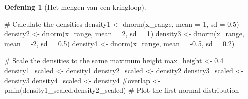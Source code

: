 \documentclass[
  a4paper,
]{scrbook}
\newenvironment{Shaded}{\begin{snugshade}}{\end{snugshade}}
\newcommand{\AttributeTok}[1]{\textcolor[rgb]{0.40,0.45,0.13}{#1}}
\newcommand{\CommentTok}[1]{\textcolor[rgb]{0.37,0.37,0.37}{#1}}
\newcommand{\DecValTok}[1]{\textcolor[rgb]{0.68,0.00,0.00}{#1}}
\newcommand{\FloatTok}[1]{\textcolor[rgb]{0.68,0.00,0.00}{#1}}
\newcommand{\FunctionTok}[1]{\textcolor[rgb]{0.28,0.35,0.67}{#1}}
\newcommand{\NormalTok}[1]{\textcolor[rgb]{0.00,0.23,0.31}{#1}}
\newcommand{\OtherTok}[1]{\textcolor[rgb]{0.00,0.23,0.31}{#1}}
\newcommand{\SpecialCharTok}[1]{\textcolor[rgb]{0.37,0.37,0.37}{#1}}
\theoremstyle{definition}
\newtheorem{exercise}{Oefening}[chapter]
\theoremstyle{remark}
\begin{document}
\begin{exercise}[Het mengen van een
kringloop]
\begin{Shaded}
\begin{Highlighting}[]
  \CommentTok{\# Calculate the densities}
\NormalTok{  density1 }\OtherTok{\textless{}{-}} \FunctionTok{dnorm}\NormalTok{(x\_range, }\AttributeTok{mean =} \DecValTok{1}\NormalTok{, }\AttributeTok{sd =} \FloatTok{0.5}\NormalTok{)}
\NormalTok{  density2 }\OtherTok{\textless{}{-}} \FunctionTok{dnorm}\NormalTok{(x\_range, }\AttributeTok{mean =} \DecValTok{2}\NormalTok{, }\AttributeTok{sd =} \DecValTok{1}\NormalTok{)}
\NormalTok{  density3 }\OtherTok{\textless{}{-}} \FunctionTok{dnorm}\NormalTok{(x\_range, }\AttributeTok{mean =} \SpecialCharTok{{-}}\DecValTok{2}\NormalTok{, }\AttributeTok{sd =} \FloatTok{0.5}\NormalTok{)}
\NormalTok{  density4 }\OtherTok{\textless{}{-}} \FunctionTok{dnorm}\NormalTok{(x\_range, }\AttributeTok{mean =} \SpecialCharTok{{-}}\FloatTok{0.5}\NormalTok{, }\AttributeTok{sd =} \FloatTok{0.2}\NormalTok{)}
  
  \CommentTok{\# Scale the densities to the same maximum height}
\NormalTok{  max\_height }\OtherTok{\textless{}{-}} \FloatTok{0.4}
\NormalTok{  density1\_scaled }\OtherTok{\textless{}{-}}\NormalTok{ density1 }
\NormalTok{  density2\_scaled }\OtherTok{\textless{}{-}}\NormalTok{ density2 }
\NormalTok{  density3\_scaled }\OtherTok{\textless{}{-}}\NormalTok{ density3 }
\NormalTok{  density4\_scaled }\OtherTok{\textless{}{-}}\NormalTok{ density4 }
  \CommentTok{\#overlap \textless{}{-} pmin(density1\_scaled,density2\_scaled)}
  \CommentTok{\# Plot the first normal distribution}
  

\end{Highlighting}
\end{Shaded}
\end{exercise}
\end{document}
